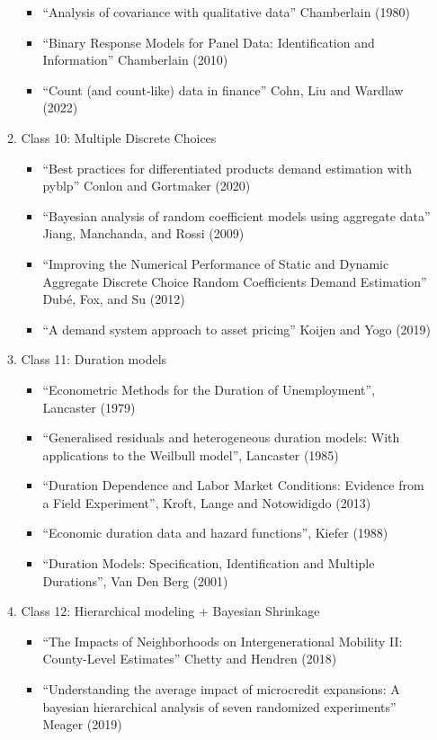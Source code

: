 \documentclass[11pt, a4paper]{article}
\begin{document}
\begin{enumerate}
\begin{enumerate}
\begin{itemize}
    \item ``Analysis of covariance with qualitative data'' Chamberlain (1980)
    \item ``Binary Response Models for Panel Data: Identification and Information'' Chamberlain (2010)
    \item ``Count (and count-like) data in finance'' Cohn, Liu and Wardlaw (2022)
    \end{itemize}
  \item Class 10: Multiple Discrete Choices
    \begin{itemize}
    \item ``Best practices for differentiated products demand estimation with pyblp'' Conlon and Gortmaker (2020)
    \item ``Bayesian analysis of random coefficient models using aggregate data'' Jiang, Manchanda, and Rossi (2009)
    \item ``Improving the Numerical Performance of Static and Dynamic Aggregate Discrete Choice Random Coefficients Demand Estimation'' Dub\'e, Fox, and Su (2012)
    \item ``A demand system approach to asset pricing'' Koijen and Yogo (2019)      
    \end{itemize}
  \item Class 11: Duration models
    \begin{itemize}
    \item ``Econometric Methods for the Duration of Unemployment'', Lancaster (1979)
    \item ``Generalised residuals and heterogeneous duration models: With applications to the Weilbull model'', Lancaster (1985)
    \item ``Duration Dependence and Labor Market Conditions: Evidence from a Field Experiment'', Kroft, Lange and Notowidigdo (2013)
    \item ``Economic duration data and hazard functions'', Kiefer (1988)
    \item ``Duration Models: Specification, Identification and Multiple Durations'', Van Den Berg (2001)
    \end{itemize}
  \item Class 12: Hierarchical modeling + Bayesian Shrinkage
    \begin{itemize}
    \item ``The Impacts of Neighborhoods on Intergenerational Mobility II: County-Level Estimates'' Chetty and Hendren (2018)
    \item ``Understanding the average impact of microcredit expansions: A bayesian hierarchical analysis of seven randomized experiments'' Meager (2019)

\end{itemize}
\end{enumerate}
\end{enumerate}
\end{document}
